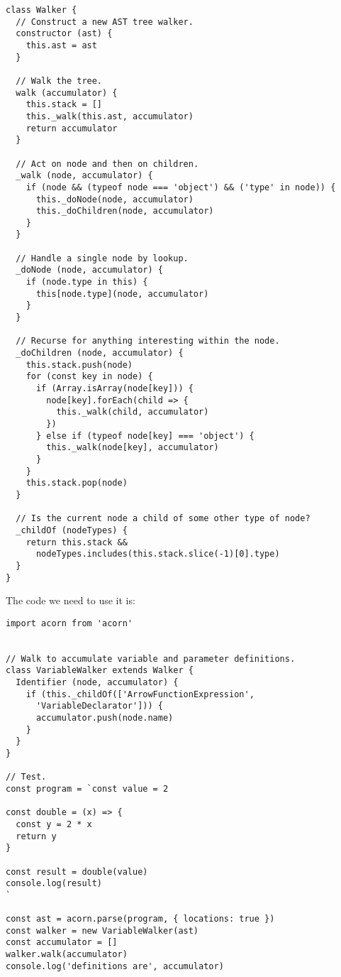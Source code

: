 \documentclass[krantzl]{krantz}
\begin{document}
\begin{lstlisting}[frame=single,frameround=tttt]
class Walker {
  // Construct a new AST tree walker.
  constructor (ast) {
    this.ast = ast
  }

  // Walk the tree.
  walk (accumulator) {
    this.stack = []
    this._walk(this.ast, accumulator)
    return accumulator
  }

  // Act on node and then on children.
  _walk (node, accumulator) {
    if (node && (typeof node === 'object') && ('type' in node)) {
      this._doNode(node, accumulator)
      this._doChildren(node, accumulator)
    }
  }

  // Handle a single node by lookup.
  _doNode (node, accumulator) {
    if (node.type in this) {
      this[node.type](node, accumulator)
    }
  }

  // Recurse for anything interesting within the node.
  _doChildren (node, accumulator) {
    this.stack.push(node)
    for (const key in node) {
      if (Array.isArray(node[key])) {
        node[key].forEach(child => {
          this._walk(child, accumulator)
        })
      } else if (typeof node[key] === 'object') {
        this._walk(node[key], accumulator)
      }
    }
    this.stack.pop(node)
  }

  // Is the current node a child of some other type of node?
  _childOf (nodeTypes) {
    return this.stack &&
      nodeTypes.includes(this.stack.slice(-1)[0].type)
  }
}
\end{lstlisting}



The code we need to use it is:


\begin{lstlisting}[frame=single,frameround=tttt]
import acorn from 'acorn'


// Walk to accumulate variable and parameter definitions.
class VariableWalker extends Walker {
  Identifier (node, accumulator) {
    if (this._childOf(['ArrowFunctionExpression',
      'VariableDeclarator'])) {
      accumulator.push(node.name)
    }
  }
}

// Test.
const program = `const value = 2

const double = (x) => {
  const y = 2 * x
  return y
}

const result = double(value)
console.log(result)
`

const ast = acorn.parse(program, { locations: true })
const walker = new VariableWalker(ast)
const accumulator = []
walker.walk(accumulator)
console.log('definitions are', accumulator)
\end{lstlisting}
\end{document}
